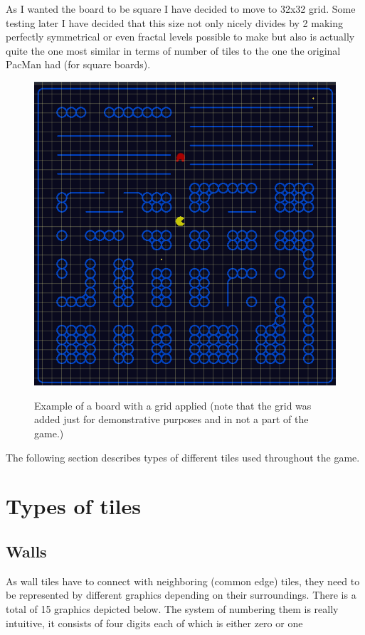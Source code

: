 \documentclass[11pt,a4paper,notitlepage]{report}
\newcommand{\dsubsection}[1]{\FloatBarrier \subsection{#1}}
\newenvironment{img}{
	\begin{center}
		\begin{figure}[H]
			\begin{center}
			
}{
	\end{center}
		\end{figure}
			\end{center}
}
\begin{document}
			As I wanted the board to be square I have decided to move to 32x32 grid. Some testing later I have decided that this size not only nicely divides by 2 making perfectly symmetrical or even fractal levels possible to make but also is actually quite the one most similar in terms of number of tiles to the one the original PacMan had (for square boards).
			\begin{img}
				\includegraphics[width=350pt]{images/board_grid}\\
				\caption{Example of a board with a grid applied (note that the grid was added just for demonstrative purposes and in not a part of the game.)}
			\end{img}
			The following section describes types of different tiles used throughout the game.
		\section{Types of tiles}
			\dsubsection{Walls}
				\label{walls}
				As wall tiles have to connect with neighboring (common edge) tiles, they need to be represented by different graphics depending on their surroundings. 
				There is a total of 15 graphics depicted below. The system of numbering them is really intuitive, it consists of four digits each of which is either zero or one
				
\end{document}
